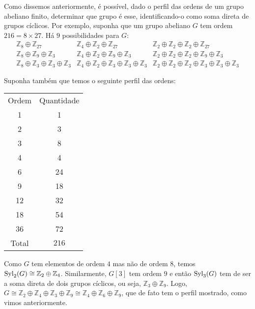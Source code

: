 	\par\vspace{0.3cm} Como dissemos anteriormente, é possível, dado o perfil das ordens de um grupo abeliano finito, determinar que grupo é esse, identificando-o como soma direta de grupos cíclicos. Por exemplo, suponha que um grupo abeliano $G$ tem ordem $216=8\times 27$. Há $9$ possibilidades para $G$:
	\begin{equation*}
		\begin{array}{lll}
			\mathbb{Z}_8\oplus\mathbb{Z}_{27} & \mathbb{Z}_4\oplus\mathbb{Z}_2\oplus\mathbb{Z}_{27} & \mathbb{Z}_2\oplus\mathbb{Z}_2\oplus\mathbb{Z}_2\oplus\mathbb{Z}_{27} \\
			\mathbb{Z}_8\oplus\mathbb{Z}_9\oplus\mathbb{Z}_3 & \mathbb{Z}_4\oplus\mathbb{Z}_2\oplus\mathbb{Z}_9\oplus\mathbb{Z}_3 & \mathbb{Z}_2\oplus\mathbb{Z}_2\oplus\mathbb{Z}_2\oplus\mathbb{Z}_9\oplus\mathbb{Z}_3 \\
			\mathbb{Z}_8\oplus\mathbb{Z}_3\oplus\mathbb{Z}_3\oplus\mathbb{Z}_3 & \mathbb{Z}_4\oplus\mathbb{Z}_2\oplus\mathbb{Z}_3\oplus\mathbb{Z}_3\oplus\mathbb{Z}_3 & \mathbb{Z}_2\oplus\mathbb{Z}_2\oplus\mathbb{Z}_2\oplus\mathbb{Z}_3\oplus\mathbb{Z}_3\oplus\mathbb{Z}_3	
		\end{array}
	\end{equation*}
	\par\vspace{0.3cm} Suponha também que temos o seguinte perfil das ordens:
	\begin{center}
		\begin{tabular}{|c|c|}
			\cline{1-2}
			Ordem & Quantidade  \\
			\cline{1-2}
			1 & 1  \\
			\cline{1-2}
			2 & 3 \\
			\cline{1-2}
			3 & 8 \\
			\cline{1-2}
			4 & 4 \\
			\cline{1-2}
			6 & 24 \\
			\cline{1-2}
			9 & 18 \\
			\cline{1-2}
			12 & 32  \\
			\cline{1-2}
			18 & 54 \\
			\cline{1-2}
			36 & 72  \\
			\cline{1-2}
			Total & $216$ \\
			\cline{1-2}
		\end{tabular}
	\end{center}
	\par\vspace{0.3cm} Como $G$ tem elementos de ordem $4$ mas não de ordem $8$, temos $\operatorname{Syl}_2(G)\cong \mathbb{Z}_2\oplus\mathbb{Z}_4$. Similarmente, $G[3]$ tem ordem $9$ e então $\operatorname{Syl}_3(G)$ tem de ser a soma direta de dois grupos cíclicos, ou seja, $\mathbb{Z}_3\oplus\mathbb{Z}_9$. Logo, $G \cong \mathbb{Z}_2\oplus\mathbb{Z}_4\oplus\mathbb{Z}_3\oplus\mathbb{Z}_9\cong \mathbb{Z}_4\oplus\mathbb{Z}_6\oplus\mathbb{Z}_9$, que de fato tem o perfil mostrado, como vimos anteriormente.
	

